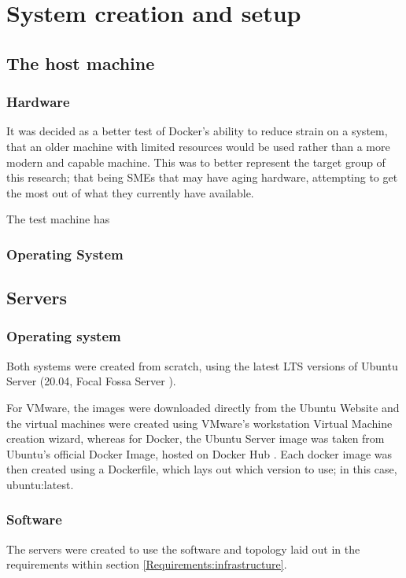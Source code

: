 
\chapter{System creation and setup}
\section{The host machine}
\subsection{Hardware}
It was decided as a better test of Docker's ability to reduce strain on a system, that an older machine with limited resources would be used rather than a more modern and capable machine. This was to better represent the target group of this research; that being SMEs that may have aging hardware, attempting to get the most out of what they currently have available.

The test machine has %

\subsection{Operating System}

\section{Servers}
\subsection{Operating system}
Both systems were created from scratch, using the latest LTS versions of Ubuntu Server (20.04, Focal Fossa Server \citep{UbuntuServerDocumentation}).

For VMware, the images were downloaded directly from the Ubuntu Website and the virtual machines were created using VMware's workstation Virtual Machine creation wizard, whereas for Docker, the Ubuntu Server image was taken from Ubuntu's official Docker Image, hosted on Docker Hub \citep{UbuntuDockerHub}. Each docker image was then created using a Dockerfile, which lays out which version to use; in this case, ubuntu:latest.

\subsection{Software}
\label{subsec:softwaresynth}
The servers were created to use the software and topology laid out in the requirements within section \ref{Requirements:infrastructure}.

